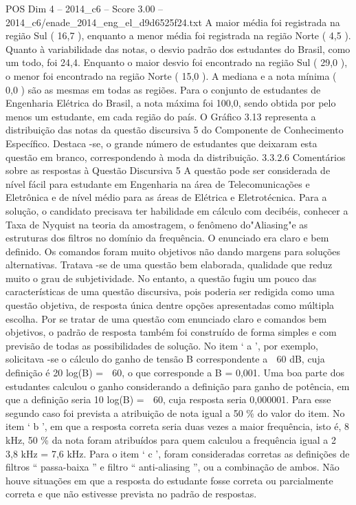 \begin{textsample}{POS Dim 4 – 2014\_c6 – Score 3.00 – 2014\_c6/enade\_2014\_eng\_el\_d9d6525f24.txt}
A maior média foi registrada na região Sul ( 16,7 ), enquanto a menor média foi registrada na região Norte ( 4,5 ).
Quanto à variabilidade das notas, o desvio padrão dos estudantes do Brasil, como um todo, foi 24,4.
Enquanto o maior desvio foi encontrado na região Sul ( 29,0 ), o menor foi encontrado na região Norte ( 15,0 ).
A mediana e a nota mínima ( 0,0 ) são as mesmas em todas as regiões.
Para o conjunto de estudantes de Engenharia Elétrica do Brasil, a nota máxima foi 100,0, sendo obtida por pelo menos um estudante, em cada região do país.
O Gráfico 3.13 representa a distribuição das notas da questão discursiva 5 do Componente de Conhecimento Específico.
Destaca -se, o grande número de estudantes que deixaram esta questão em branco, correspondendo à moda da distribuição. 3.3.2.6 Comentários sobre as respostas à Questão Discursiva 5 A questão pode ser considerada de nível fácil para estudante em Engenharia na área de Telecomunicações e Eletrônica e de nível médio para as áreas de Elétrica e Eletrotécnica.
Para a solução, o candidato precisava ter habilidade em cálculo com decibéis, conhecer a Taxa de Nyquist na teoria da amostragem, o fenômeno do"Aliasing"e as estruturas dos filtros no domínio da frequência.
O enunciado era claro e bem definido.
Os comandos foram muito objetivos não dando margens para soluções alternativas.
Tratava -se de uma questão bem elaborada, qualidade que reduz muito o grau de subjetividade.
No entanto, a questão fugiu um pouco das características de uma questão discursiva, pois poderia ser redigida como uma questão objetiva, de resposta única dentre opções apresentadas como múltipla escolha.
Por se tratar de uma questão com enunciado claro e comandos bem objetivos, o padrão de resposta também foi construído de forma simples e com previsão de todas as possibilidades de solução.
No item ‘ a ’, por exemplo, solicitava -se o cálculo do ganho de tensão B correspondente a  60 dB, cuja definição é 20 log(B) =  60, o que corresponde a B = 0,001.
Uma boa parte dos estudantes calculou o ganho considerando a definição para ganho de potência, em que a definição seria 10 log(B) =  60, cuja resposta seria 0,000001.
Para esse segundo caso foi prevista a atribuição de nota igual a 50 \% do valor do item.
No item ‘ b ’, em que a resposta correta seria duas vezes a maior frequência, isto é, 8 kHz, 50 \% da nota foram atribuídos para quem calculou a frequência igual a 2  3,8 kHz = 7,6 kHz.
Para o item ‘ c ’, foram consideradas corretas as definições de filtros “ passa-baixa ” e filtro “ anti-aliasing ”, ou a combinação de ambos.
Não houve situações em que a resposta do estudante fosse correta ou parcialmente correta e que não estivesse prevista no padrão de respostas.

\end{textsample}

